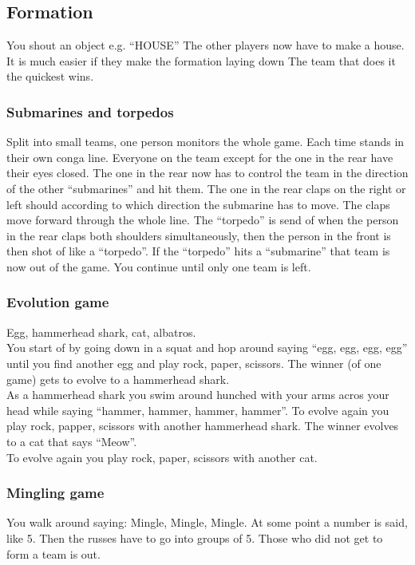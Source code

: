 \documentclass[../../../main.tex]{subfiles}
\begin{document}
\begin{multicols}{2}
\subsection*{Formation}
    You shout an object e.g. ``HOUSE''
    The other players now have to make a house.
    It is much easier if they make the formation laying down
    The team that does it the quickest wins.
    
\subsubsection*{Submarines and torpedos}
Split into small teams, one person monitors the whole game. Each time stands in their own conga line. Everyone on the team except for the one in the rear have their eyes closed. The one in the rear now has to control the team in the direction of the other ``submarines'' and hit them. The one in the rear claps on the right or left should according to which direction the submarine has to move. The claps move forward through the whole line. The ``torpedo'' is send of when the person in the rear claps both shoulders simultaneously, then the person in the front is then shot of like a ``torpedo''. If the ``torpedo'' hits a ``submarine'' that team is now out of the game. You continue until only one team is left.

\subsubsection*{Evolution game}
Egg, hammerhead shark, cat, albatros.\\
You start of by going down in a squat and hop around saying ``egg, egg, egg, egg'' until you find another egg and play rock, paper, scissors. The winner (of one game) gets to evolve to a hammerhead shark.\\
As a hammerhead shark you swim around hunched with your arms acros your head while saying ``hammer, hammer, hammer, hammer''. To evolve again you play rock, papper, scissors with another hammerhead shark. The winner evolves to a cat that says ``Meow''. \\
To evolve again you play rock, paper, scissors with another cat.

\subsubsection*{Mingling game}
You walk around saying: Mingle, Mingle, Mingle. At some point a number is said, like 5. Then the russes have to go into groups of 5. Those who did not get to form a team is out.


\end{multicols}
\end{document}
